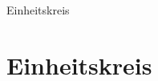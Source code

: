 \documentclass{standalone}
\begin{document}
\begin{frame}
  \begin{center}
    Einheitskreis
  \end{center}
  \section{Einheitskreis}
\end{frame}









%
\end{document}
